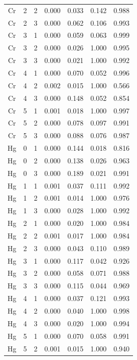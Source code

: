 \documentclass[ms, hidelinks]{uncgdissertationexp3}
\theoremstyle{plain}
\theoremstyle{definition}
\theoremstyle{remark}
\begin{document}
\begin{longtable}{ccccccc}
  Cr & 2 & 2 & 0.000 & 0.033 & 0.142 & 0.988\\
  \rowcolor{gray!6}  Cr & 2 & 3 & 0.000 & 0.062 & 0.106 & 0.993\\
  Cr & 3 & 1 & 0.000 & 0.059 & 0.063 & 0.999\\
  \rowcolor{gray!6}  Cr & 3 & 2 & 0.000 & 0.026 & 1.000 & 0.995\\
  Cr & 3 & 3 & 0.000 & 0.021 & 1.000 & 0.992\\
  \rowcolor{gray!6}  Cr & 4 & 1 & 0.000 & 0.070 & 0.052 & 0.996\\
  Cr & 4 & 2 & 0.002 & 0.015 & 1.000 & 0.566\\
  \rowcolor{gray!6}  Cr & 4 & 3 & 0.000 & 0.148 & 0.052 & 0.854\\
  Cr & 5 & 1 & 0.001 & 0.018 & 1.000 & 0.997\\
  \rowcolor{gray!6}  Cr & 5 & 2 & 0.000 & 0.078 & 0.097 & 0.991\\
  Cr & 5 & 3 & 0.000 & 0.088 & 0.076 & 0.987\\
  \rowcolor{gray!6}  Hg & 0 & 1 & 0.000 & 0.144 & 0.018 & 0.816\\
  Hg & 0 & 2 & 0.000 & 0.138 & 0.026 & 0.963\\
  \rowcolor{gray!6}  Hg & 0 & 3 & 0.000 & 0.189 & 0.021 & 0.991\\
  Hg & 1 & 1 & 0.001 & 0.037 & 0.111 & 0.992\\
  \rowcolor{gray!6}  Hg & 1 & 2 & 0.001 & 0.014 & 1.000 & 0.976\\
  Hg & 1 & 3 & 0.000 & 0.028 & 1.000 & 0.992\\
  \rowcolor{gray!6}  Hg & 2 & 1 & 0.000 & 0.020 & 1.000 & 0.984\\
  Hg & 2 & 2 & 0.001 & 0.017 & 1.000 & 0.984\\
  \rowcolor{gray!6}  Hg & 2 & 3 & 0.000 & 0.043 & 0.110 & 0.989\\
  Hg & 3 & 1 & 0.000 & 0.117 & 0.042 & 0.926\\
  \rowcolor{gray!6}  Hg & 3 & 2 & 0.000 & 0.058 & 0.071 & 0.988\\
  Hg & 3 & 3 & 0.000 & 0.115 & 0.044 & 0.969\\
  \rowcolor{gray!6}  Hg & 4 & 1 & 0.000 & 0.037 & 0.121 & 0.993\\
  Hg & 4 & 2 & 0.000 & 0.040 & 1.000 & 0.998\\
  \rowcolor{gray!6}  Hg & 4 & 3 & 0.000 & 0.020 & 1.000 & 0.994\\
  Hg & 5 & 1 & 0.000 & 0.070 & 0.058 & 0.991\\
  \rowcolor{gray!6}  Hg & 5 & 2 & 0.001 & 0.015 & 1.000 & 0.940\\

\end{longtable}
\end{document}
